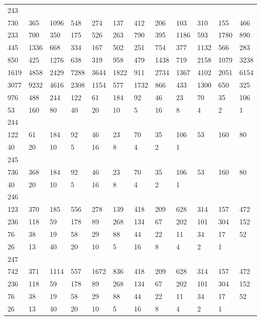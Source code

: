 \begin{longtable}{llllllllllll}
243&&&&&&&&&&&\\
730& 365& 1096& 548& 274& 137& 412& 206& 103& 310& 155& 466\\
233& 700& 350& 175& 526& 263& 790& 395& 1186& 593& 1780& 890\\
445& 1336& 668& 334& 167& 502& 251& 754& 377& 1132& 566& 283\\
850& 425& 1276& 638& 319& 958& 479& 1438& 719& 2158& 1079& 3238\\
1619& 4858& 2429& 7288& 3644& 1822& 911& 2734& 1367& 4102& 2051& 6154\\
3077& 9232& 4616& 2308& 1154& 577& 1732& 866& 433& 1300& 650& 325\\
976& 488& 244& 122& 61& 184& 92& 46& 23& 70& 35& 106\\
53& 160& 80& 40& 20& 10& 5& 16& 8& 4& 2& 1\\

244&&&&&&&&&&&\\
122& 61& 184& 92& 46& 23& 70& 35& 106& 53& 160& 80\\
40& 20& 10& 5& 16& 8& 4& 2& 1& \\

245&&&&&&&&&&&\\
736& 368& 184& 92& 46& 23& 70& 35& 106& 53& 160& 80\\
40& 20& 10& 5& 16& 8& 4& 2& 1& \\

246&&&&&&&&&&&\\
123& 370& 185& 556& 278& 139& 418& 209& 628& 314& 157& 472\\
236& 118& 59& 178& 89& 268& 134& 67& 202& 101& 304& 152\\
76& 38& 19& 58& 29& 88& 44& 22& 11& 34& 17& 52\\
26& 13& 40& 20& 10& 5& 16& 8& 4& 2& 1& \\

247&&&&&&&&&&&\\
742& 371& 1114& 557& 1672& 836& 418& 209& 628& 314& 157& 472\\
236& 118& 59& 178& 89& 268& 134& 67& 202& 101& 304& 152\\
76& 38& 19& 58& 29& 88& 44& 22& 11& 34& 17& 52\\
26& 13& 40& 20& 10& 5& 16& 8& 4& 2& 1& \\


\end{longtable}
